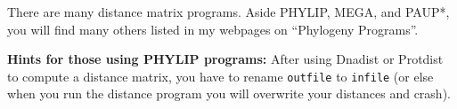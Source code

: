 \documentclass[12pt]{article}
\begin{document}
There are many distance matrix programs.  Aside PHYLIP, MEGA, and PAUP*, you
will find many others listed in my webpages on ``Phylogeny Programs''.
\bigskip

{\bf Hints for those using PHYLIP programs:}
After using Dnadist or Protdist to compute a distance matrix, you have to
rename {\tt outfile} to {\tt infile} (or else when you run the distance
program you will overwrite your distances and crash).
\end{document}
